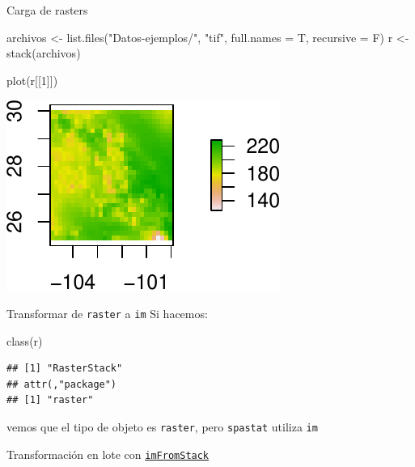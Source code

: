 \documentclass[
  11pt,
  ignorenonframetext,
]{beamer}
\newenvironment{Shaded}{}{}
\newcommand{\AttributeTok}[1]{\textcolor[rgb]{0.49,0.56,0.16}{#1}}
\newcommand{\DecValTok}[1]{\textcolor[rgb]{0.25,0.63,0.44}{#1}}
\newcommand{\FunctionTok}[1]{\textcolor[rgb]{0.02,0.16,0.49}{#1}}
\newcommand{\NormalTok}[1]{#1}
\newcommand{\OtherTok}[1]{\textcolor[rgb]{0.00,0.44,0.13}{#1}}
\newcommand{\StringTok}[1]{\textcolor[rgb]{0.25,0.44,0.63}{#1}}
\begin{document}
\begin{frame}[fragile]{Carga de rasters}
\protect\hypertarget{carga-de-rasters}{}
\begin{Shaded}
\begin{Highlighting}[]
\NormalTok{archivos }\OtherTok{\textless{}{-}} \FunctionTok{list.files}\NormalTok{(}\StringTok{"Datos{-}ejemplos/"}\NormalTok{, }\StringTok{"tif"}\NormalTok{, }
                       \AttributeTok{full.names =}\NormalTok{ T, }
                       \AttributeTok{recursive =}\NormalTok{ F)}
\NormalTok{r }\OtherTok{\textless{}{-}} \FunctionTok{stack}\NormalTok{(archivos)}
\end{Highlighting}
\end{Shaded}

\begin{Shaded}
\begin{Highlighting}[]
\FunctionTok{plot}\NormalTok{(r[[}\DecValTok{1}\NormalTok{]])}
\end{Highlighting}
\end{Shaded}

\begin{center}\includegraphics{Tutorial-spatstat_files/figure-beamer/unnamed-chunk-6-1} \end{center}
\end{frame}

\begin{frame}[fragile]{Transformar de \texttt{raster} a \texttt{im}}
\protect\hypertarget{transformar-de-raster-a-im}{}
Si hacemos:

\begin{Shaded}
\begin{Highlighting}[]
\FunctionTok{class}\NormalTok{(r)}
\end{Highlighting}
\end{Shaded}

\begin{verbatim}
## [1] "RasterStack"
## attr(,"package")
## [1] "raster"
\end{verbatim}

vemos que el tipo de objeto es \texttt{raster}, pero \texttt{spastat}
utiliza \texttt{im}

Transformación en lote con
\href{Funciones-spatstat/imFromStack.R}{\texttt{imFromStack}}
\end{frame}
\end{document}
